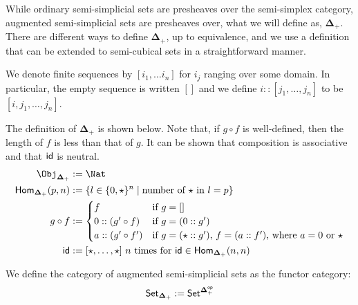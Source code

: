 \documentclass{msc}
\newcommand{\DeltaPlus}{\ensuremath{\boldsymbol{\Delta}_+}}
\newcommand{\kstar}{{\star}}
\begin{document}
While ordinary semi-simplicial sets are presheaves over the semi-simplex category, augmented semi-simplicial sets are presheaves over, what we will define as, \DeltaPlus. There are different ways to define \DeltaPlus, up to equivalence, and we use a definition that can be extended to semi-cubical sets in a straightforward manner.

\begin{notation}
  We denote finite sequences by $[i_1, \ldots i_n]$ for $i_j$ ranging over some domain. In particular, the empty sequence is written $[]$ and we define $i :: [j_1, \ldots, j_n]$ to be $[i, j_1, \ldots, j_n]$.
\end{notation}

\begin{definition}[$\DeltaPlus$]
  The definition of $\DeltaPlus$ is shown below. Note that, if $g \circ f$ is well-defined, then the length of $f$ is less than that of $g$. It can be shown that composition is associative and that $\mathsf{id}$ is neutral.
  \begin{align*}
    \Obj_{\DeltaPlus}       & := \Nat                                                                             \\
    \Hom_{\DeltaPlus}(p, n) & := \{l \in \{0, \kstar\}^n \mid \text{number of $\kstar$ in $l = p$}\}              \\
    g \circ f               & :=
    \begin{cases}
      f                  & \text{if $g = []$}                                                        \\
      0 :: (g' \circ f)  & \text{if $g = (0 :: g')$}                                                 \\
      a :: (g' \circ f') & \text{if $g = (\star :: g')$, $f = (a :: f')$, where $a = 0$ or $\kstar$} \\
    \end{cases}                \\
    \id                     & := [\kstar, \ldots, \kstar] \text{ $n$ times for $\id \in \Hom_{\DeltaPlus}(n, n)$}
  \end{align*}
\end{definition}

\begin{definition}[$\Set_{\DeltaPlus}$]
  We define the category of augmented semi-simplicial sets as the functor category:
  \begin{equation*}
    \Set_{\DeltaPlus} := \Set^{\DeltaPlus^{\mathsf{op}}}
  \end{equation*}
\end{definition}
\end{document}
